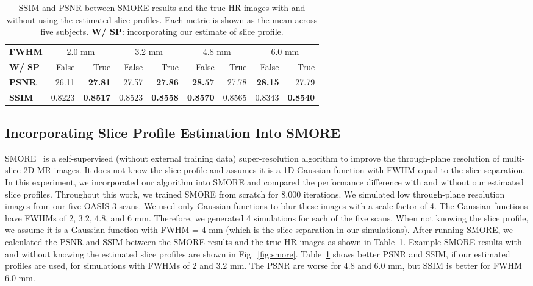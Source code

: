 \documentclass[runningheads]{llncs}
\begin{document}
%
\begin{table}[t]
  \centering
  \setlength{\tabcolsep}{4.2pt}
  \caption{SSIM and PSNR between SMORE results and the true HR images
  with and without using the estimated slice profiles. Each metric is
  shown as the mean across five subjects. \textbf{W/ SP}:
  incorporating our estimate of slice profile.}
  \begin{tabular}{lrrrrrrrr}
  \toprule
  \textbf{FWHM} & \multicolumn{2}{c}{2.0 mm} & \multicolumn{2}{c}{3.2 mm} & \multicolumn{2}{c}{4.8 mm} & \multicolumn{2}{c}{6.0 mm} \\

  \cmidrule{1-1}
  \cmidrule(l){2-3}
  \cmidrule(l){4-5}
  \cmidrule(l){6-7}
  \cmidrule(l){8-9}

  \textbf{W/ SP} &   False &   True  &   False &   True  &   False &   True  &   False &   True  \\
  \midrule
  \textbf{PSNR} &   26.11 &   \textbf{27.81} &   27.57 &
  \textbf{27.86} &   \textbf{28.57} &   27.78 &   \textbf{28.15} &
  27.79 \\
  \textbf{SSIM} &  0.8223 &  \textbf{0.8517} &  0.8523 &  \textbf{0.8558} &  \textbf{0.8570} &  0.8565 &  0.8343 &  \textbf{0.8540} \\
  \bottomrule
  \end{tabular}
  \label{tab:smore}
\end{table}

\subsection{Incorporating Slice Profile Estimation Into SMORE}

SMORE~\cite{zhao-2018-smore} is a self-supervised
(without external training data) super-resolution algorithm to improve
the through-plane resolution of multi-slice 2D MR images. It
does not know the slice profile and assumes it is a 1D Gaussian
function with FWHM equal to the slice separation. In this experiment,
we incorporated our algorithm into SMORE and compared the performance
difference with and without our estimated slice profiles. Throughout
this work, we trained SMORE from scratch for 8,000 iterations. We
simulated low through-plane resolution images from our five OASIS-3
scans. We used only Gaussian functions to blur these images with
a scale factor of 4. The Gaussian functions have FWHMs of 2, 3.2, 4.8,
and 6 mm. Therefore, we generated 4 simulations for each of the five
scans.  When not knowing the slice profile, we assume it is a Gaussian
function with FWHM = 4 mm (which is the slice separation in our
simulations). After running SMORE, we calculated the PSNR and SSIM
between the SMORE results and the true HR images as shown in
Table~\ref{tab:smore}. Example SMORE results with and without knowing
the estimated slice profiles are shown in Fig.~\ref{fig:smore}.
Table~\ref{tab:smore} shows better PSNR and SSIM, if our estimated
profiles are used, for simulations with FWHMs of 2 and 3.2 mm. The
PSNR are worse for 4.8 and 6.0 mm, but SSIM is better for FWHM 6.0 mm.
\end{document}
